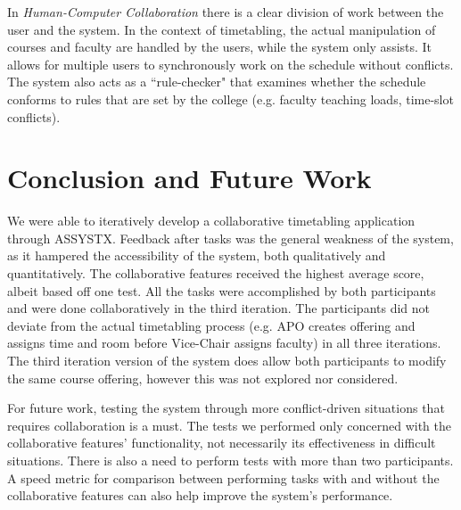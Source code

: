 In \textit{Human-Computer Collaboration} there is a clear division of work between the user and the system. In the context of timetabling, the actual manipulation of courses and faculty are handled by the users, while the system only assists. It allows for multiple users to synchronously work on the schedule without conflicts. The system also acts as a ``rule-checker" that examines whether the schedule conforms to rules that are set by the college (e.g. faculty teaching loads, time-slot conflicts).  

\section{Conclusion and Future Work}
We were able to iteratively develop a collaborative timetabling application through ASSYSTX. Feedback after tasks was the general weakness of the system, as it hampered the accessibility of the system, both qualitatively and quantitatively. The collaborative features received the highest average score, albeit based off one test. All the tasks were accomplished by both participants and were done collaboratively in the third iteration. The participants did not deviate from the actual timetabling process (e.g. APO creates offering and assigns time and room before Vice-Chair assigns faculty) in all three iterations. The third iteration version of the system does allow both participants to modify the same course offering, however this was not explored nor considered.

For future work, testing the system through more conflict-driven situations that requires collaboration is a must. The tests we performed only concerned with the collaborative features' functionality, not necessarily its effectiveness in difficult situations. There is also a need to perform tests with more than two participants. A speed metric for comparison between performing tasks with and without the collaborative features can also help improve the system's performance.

